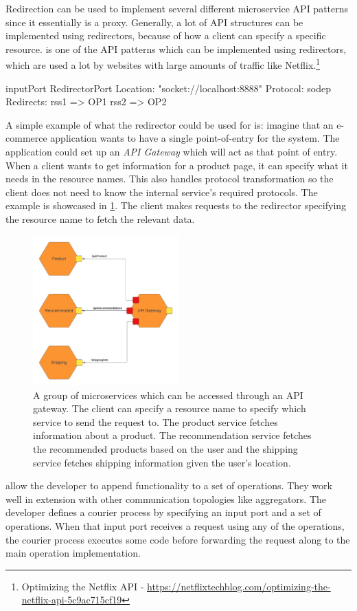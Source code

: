 Redirection can be used to implement several different microservice API patterns since it essentially is a proxy.
Generally, a lot of API structures can be implemented using redirectors, because of how a client can specify a specific resource.
 is one of the API patterns which can be implemented using redirectors, which are used a lot by websites with large amounts of traffic like Netflix.\footnote{Optimizing the Netflix API - \url{https://netflixtechblog.com/optimizing-the-netflix-api-5c9ac715cf19}}

\begin{jolisting}[][caption={Input port which redirects requests using resource names}, label=lst:redirector-inputport]
inputPort RedirectorPort {
    Location: "socket://localhost:8888"
    Protocol: sodep
    Redirects:
        rss1 => OP1
        rss2 => OP2
}
\end{jolisting}

A simple example of what the redirector could be used for is: imagine that an e-commerce application wants to have a single point-of-entry for the system. The application could set up an \textit{API Gateway} which will act as that point of entry. 
When a client wants to get information for a product page, it can specify what it needs in the resource names. This also handles protocol transformation so the client does not need to know the internal service's required protocols.
The example is showcased in \cref{figure:redirector_example}. The client makes requests to the redirector specifying the resource name to fetch the relevant data.
\begin{figure}[h!]
    \center
    \includegraphics[width=0.5\textwidth]{figures/redirector_example.png}
    \caption{A group of microservices which can be accessed through an API gateway. 
    The client can specify a resource name to specify which service to send the request to.
    The product service fetches information about a product. The recommendation service fetches
    the recommended products based on the user and the shipping service fetches shipping information given the user's location.}
    \label{figure:redirector_example}
\end{figure}
  allow the developer to append functionality to a set of operations. They work well in extension with other communication topologies like aggregators.
The developer defines a courier process by specifying an input port and a set of operations. When that input port receives a request using any of the operations, the courier process executes some code before forwarding
the request along to the main operation implementation.

